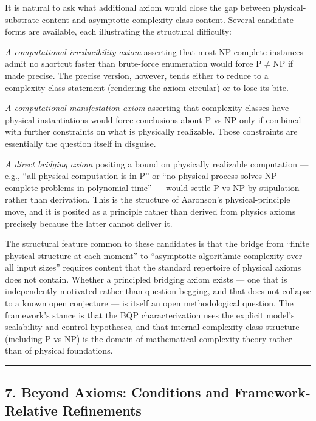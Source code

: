\documentclass[
]{article}
\begin{document}
It is natural to ask what additional axiom would close the gap between
physical-substrate content and asymptotic complexity-class content.
Several candidate forms are available, each illustrating the structural
difficulty:

\emph{A computational-irreducibility axiom} asserting that most
NP-complete instances admit no shortcut faster than brute-force
enumeration would force \(\mathrm{P} \neq \mathrm{NP}\) if made precise.
The precise version, however, tends either to reduce to a
complexity-class statement (rendering the axiom circular) or to lose its
bite.

\emph{A computational-manifestation axiom} asserting that complexity
classes have physical instantiations would force conclusions about P vs
NP only if combined with further constraints on what is physically
realizable. Those constraints are essentially the question itself in
disguise.

\emph{A direct bridging axiom} positing a bound on physically realizable
computation --- e.g., ``all physical computation is in P'' or ``no
physical process solves NP-complete problems in polynomial time'' ---
would settle P vs NP by stipulation rather than derivation. This is the
structure of Aaronson's physical-principle move, and it is posited as a
principle rather than derived from physics axioms precisely because the
latter cannot deliver it.

The structural feature common to these candidates is that the bridge
from ``finite physical structure at each moment'' to ``asymptotic
algorithmic complexity over all input sizes'' requires content that the
standard repertoire of physical axioms does not contain. Whether a
principled bridging axiom exists --- one that is independently motivated
rather than question-begging, and that does not collapse to a known open
conjecture --- is itself an open methodological question. The
framework's stance is that the BQP characterization uses the explicit
model's scalability and control hypotheses, and that internal
complexity-class structure (including P vs NP) is the domain of
mathematical complexity theory rather than of physical foundations.

\begin{center}\rule{0.5\linewidth}{0.5pt}\end{center}

\hypertarget{beyond-axioms-conditions-and-framework-relative-refinements}{%
\subsection{7. Beyond Axioms: Conditions and Framework-Relative
Refinements}\label{beyond-axioms-conditions-and-framework-relative-refinements}}
\end{document}
